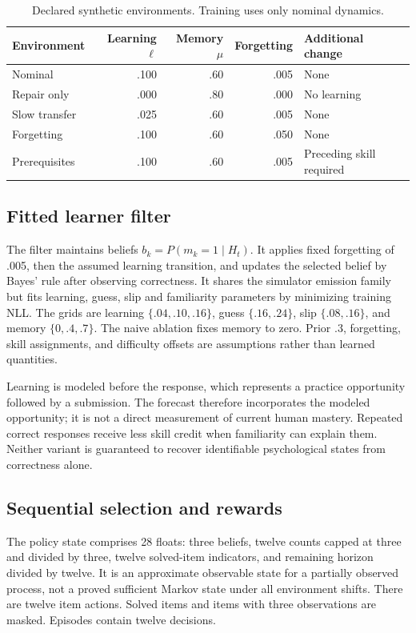 \documentclass[11pt,a4paper]{article}
\begin{document}
\begin{table}[ht]
\centering\small
\begin{tabular}{lrrrl}\toprule
Environment & Learning $\ell$ & Memory $\mu$ & Forgetting & Additional change\\\midrule
Nominal & .100 & .60 & .005 & None\\
Repair only & .000 & .80 & .000 & No learning\\
Slow transfer & .025 & .60 & .005 & None\\
Forgetting & .100 & .60 & .050 & None\\
Prerequisites & .100 & .60 & .005 & Preceding skill required\\\bottomrule
\end{tabular}
\caption{Declared synthetic environments. Training uses only nominal dynamics.}\label{tab:worlds}
\end{table}

\subsection{Fitted learner filter}
The filter maintains beliefs $b_k=P(m_k=1\mid H_t)$. It applies fixed forgetting of .005, then the assumed learning transition, and updates the selected belief by Bayes' rule after observing correctness. It shares the simulator emission family but fits learning, guess, slip and familiarity parameters by minimizing training NLL. The grids are learning $\{.04,.10,.16\}$, guess $\{.16,.24\}$, slip $\{.08,.16\}$, and memory $\{0,.4,.7\}$. The naive ablation fixes memory to zero. Prior .3, forgetting, skill assignments, and difficulty offsets are assumptions rather than learned quantities.

Learning is modeled before the response, which represents a practice opportunity followed by a submission. The forecast therefore incorporates the modeled opportunity; it is not a direct measurement of current human mastery. Repeated correct responses receive less skill credit when familiarity can explain them. Neither variant is guaranteed to recover identifiable psychological states from correctness alone.

\subsection{Sequential selection and rewards}
The policy state comprises 28 floats: three beliefs, twelve counts capped at three and divided by three, twelve solved-item indicators, and remaining horizon divided by twelve. It is an approximate observable state for a partially observed process, not a proved sufficient Markov state under all environment shifts. There are twelve item actions. Solved items and items with three observations are masked. Episodes contain twelve decisions.
\end{document}
